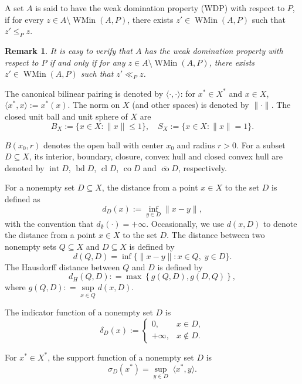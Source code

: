 \documentclass[10pt,a4paper]{amsart}
\DeclareMathOperator{\intr}{int}
\DeclareMathOperator{\cl}{cl}
\DeclareMathOperator{\bd}{bd}
\DeclareMathOperator{\co}{co}
\newtheorem{remark}{Remark}[section]
\begin{document}
A set $A$ is said to have the  weak domination property  (WDP) with respect to $P$, if for every $z \in A \setminus \operatorname{WMin}(A, P)$, there exists $z' \in \operatorname{WMin}(A, P)$ such that $z' \leq_P z$.

\begin{remark} \label{RngXEQ}     It is easy to verify that  $A$ has  the  weak domination property with respect to $P$ if and only if for any $z \in A \setminus \operatorname{WMin}(A, P)$, there exists $z' \in \operatorname{WMin}(A, P)$ such that $z'  \ll_P  z$.
\end{remark}


The canonical bilinear pairing is denoted by $\langle \cdot, \cdot \rangle$: for $x^* \in X^*$ and $x \in X$, $\langle x^*, x \rangle := x^*(x)$. The norm on $X$ (and other spaces) is denoted by $\|\cdot\|$. The closed unit ball and unit sphere of $X$ are
\[
B_X := \{x \in X : \|x\| \leq 1\}, \quad S_X := \{x \in X : \|x\| = 1\}.
\]

$B(x_0,r)$ denotes the open ball with center $x_0$ and radius $r > 0$. For a subset $D \subseteq X$, its interior, boundary, closure, convex hull  and  closed convex hull    are denoted by $\intr D$, $\bd D$, $\cl D$, $\co D$ and $\overline{\co} D$,  respectively.

 


For a nonempty set \(D \subseteq X\), the distance from a point \(x \in X\) to the set \(D\) is defined as
\[
d_D(x) := \inf_{y \in D} \|x - y\|,
\]
with the convention that \(d_\emptyset(\cdot) = +\infty\). Occasionally, we use \(d(x,D)\) to denote the distance from a point \(x \in X\) to the set \(D\).
The distance between two nonempty sets \(Q \subseteq X\) and \(D \subseteq X\) is defined by
\[
d(Q,D) = \inf \{ \|x - y\| : x \in Q,\; y \in D \}.
\]
The Hausdorff distance between $Q$ and $D$ is defined by
$$d_H \left( {Q,D} \right): = \max \left\{ {g\left( {Q,D} \right),g\left( {D,Q} \right)} \right\},$$
where $g\left( {Q,D} \right): = \mathop {\sup }\limits_{x \in Q} d\left( {x,D} \right)$.  
 





The  indicator function  of a  nonempty set   $D$ is
\[
\delta_D(x) := \begin{cases}
	0, & x \in D, \\
	+\infty, & x \notin D.
\end{cases}
\]


For  $ x^* \in X^*$,     the support function   of a  nonempty set   $D$ is
$$\sigma_D(x^*)=\sup_{y\in D}  \;  \langle x^*,y\rangle.$$
\end{document}

